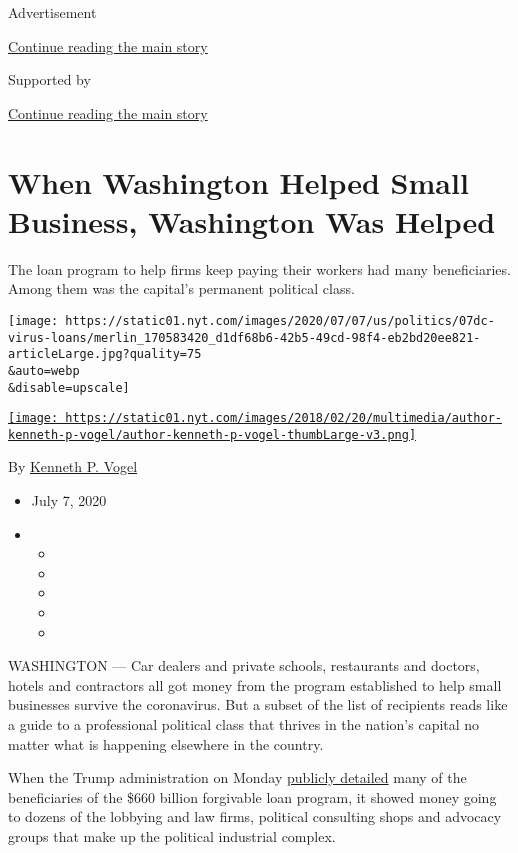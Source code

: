 Advertisement

\protect\hyperlink{after-top}{Continue reading the main story}

Supported by

\protect\hyperlink{after-sponsor}{Continue reading the main story}

\hypertarget{when-washington-helped-small-business-washington-was-helped}{%
\section{When Washington Helped Small Business, Washington Was
Helped}\label{when-washington-helped-small-business-washington-was-helped}}

The loan program to help firms keep paying their workers had many
beneficiaries. Among them was the capital's permanent political class.

\texttt{[image: https://static01.nyt.com/images/2020/07/07/us/politics/07dc-virus-loans/merlin\_170583420\_d1df68b6-42b5-49cd-98f4-eb2bd20ee821-articleLarge.jpg?quality=75\\\&auto=webp\\\&disable=upscale]}

\href{https://www.nytimes.com/by/kenneth-p-vogel}{\texttt{[image: https://static01.nyt.com/images/2018/02/20/multimedia/author-kenneth-p-vogel/author-kenneth-p-vogel-thumbLarge-v3.png]}}

By \href{https://www.nytimes.com/by/kenneth-p-vogel}{Kenneth P. Vogel}

\begin{itemize}
\item
  July 7, 2020
\item
  \begin{itemize}
  \item
  \item
  \item
  \item
  \item
  \end{itemize}
\end{itemize}

WASHINGTON --- Car dealers and private schools, restaurants and doctors,
hotels and contractors all got money from the program established to
help small businesses survive the coronavirus. But a subset of the list
of recipients reads like a guide to a professional political class that
thrives in the nation's capital no matter what is happening elsewhere in
the country.

When the Trump administration on Monday
\href{https://www.nytimes.com/2020/07/06/us/ppp-small-business-loans.html}{publicly
detailed} many of the beneficiaries of the \$660 billion forgivable loan
program, it showed money going to dozens of the lobbying and law firms,
political consulting shops and advocacy groups that make up the
political industrial complex.

